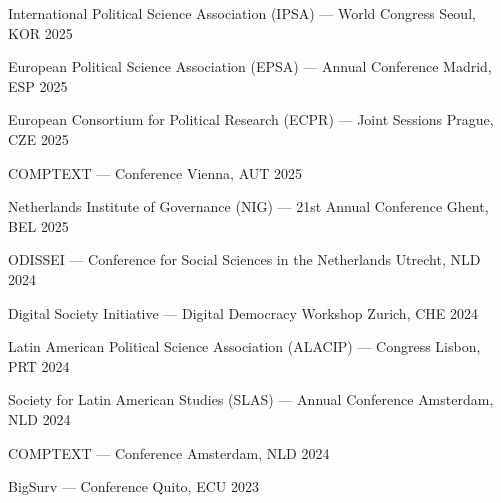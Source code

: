 

\begin{cvhonors}
\cvconf
{International Political Science Association (IPSA) --- World Congress} 
{Seoul, KOR}
{2025}
\end{cvhonors}

\begin{cvhonors}
\cvconf
{European Political Science Association (EPSA) --- Annual Conference} 
{Madrid, ESP}
{2025}
\end{cvhonors}

\begin{cvhonors}
\cvconf
{European Consortium for Political Research (ECPR) --- Joint Sessions} 
{Prague, CZE}
{2025}
\end{cvhonors}

\begin{cvhonors}
\cvconf
{COMPTEXT --- Conference} 
{Vienna, AUT}
{2025}
\end{cvhonors}

\begin{cvhonors}
\cvconf
{Netherlands Institute of Governance (NIG) --- 21st Annual Conference} 
{Ghent, BEL}
{2025}
\end{cvhonors}

\begin{cvhonors}
\cvconf
{ODISSEI --- Conference for Social Sciences in the Netherlands} 
{Utrecht, NLD}
{2024}
\end{cvhonors}

\begin{cvhonors}
\cvconf
{Digital Society Initiative --- Digital Democracy Workshop} 
{Zurich, CHE}
{2024}
\end{cvhonors}

\begin{cvhonors}
\cvconf
{Latin American Political Science Association (ALACIP) --- Congress} 
{Lisbon, PRT}
{2024}
\end{cvhonors}

\begin{cvhonors}
\cvconf
{Society for Latin American Studies (SLAS) --- Annual Conference} 
{Amsterdam, NLD}
{2024}
\end{cvhonors}

\begin{cvhonors}
\cvconf
{COMPTEXT --- Conference} 
{Amsterdam, NLD}
{2024}
\end{cvhonors}

\begin{cvhonors}
\cvconf
{BigSurv --- Conference} 
{Quito, ECU}
{2023}
\end{cvhonors}

